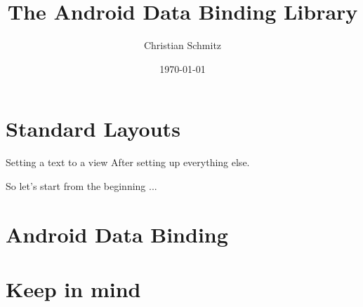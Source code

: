\usepackage[ngerman]{babel}
\usepackage[T1]{fontenc}
\usepackage[utf8]{inputenc}
\usepackage{lmodern}
\usepackage{listings}


\title{The Android Data Binding Library}
\author{Christian Schmitz}
\date{\today}



\maketitle

\section{Standard Layouts}
\frame{\tableofcontents[currentsection]}

\begin{frame}[fragile]{Setting a text to a view}
  After setting up everything else.

  So let's start from the beginning ...
\end{frame}


%

\section{Android Data Binding}
\frame{\tableofcontents[currentsection]}






\section{Keep in mind}
\frame{\tableofcontents[currentsection]}




